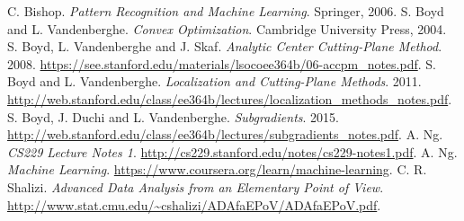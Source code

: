 \documentclass[11pt]{amsart}
\theoremstyle{definition}
\theoremstyle{remark}
\begin{document}
\renewcommand\refname{Bibliography}
\begin{thebibliography}{99}
     C. Bishop. \emph{Pattern Recognition and Machine Learning}. Springer, 2006.
     S. Boyd and L. Vandenberghe. \emph{Convex Optimization}. Cambridge University Press, 2004.
     S. Boyd, L. Vandenberghe and J. Skaf. \emph{Analytic Center Cutting-Plane Method}. 2008. \url{https://see.stanford.edu/materials/lsocoee364b/06-accpm_notes.pdf}.
     S. Boyd and L. Vandenberghe. \emph{Localization and Cutting-Plane Methods}. 2011. \url{http://web.stanford.edu/class/ee364b/lectures/localization_methods_notes.pdf}.
     S. Boyd, J. Duchi and L. Vandenberghe. \emph{Subgradients}. 2015. \url{http://web.stanford.edu/class/ee364b/lectures/subgradients_notes.pdf}.
     A. Ng. \emph{CS229 Lecture Notes 1}. \url{http://cs229.stanford.edu/notes/cs229-notes1.pdf}.
     A. Ng. \emph{Machine Learning}. \url{https://www.coursera.org/learn/machine-learning}.
     C. R. Shalizi. \emph{Advanced Data Analysis
    from an Elementary Point of View}. \url{http://www.stat.cmu.edu/~cshalizi/ADAfaEPoV/ADAfaEPoV.pdf}. 
\end{thebibliography}




\end{document}
